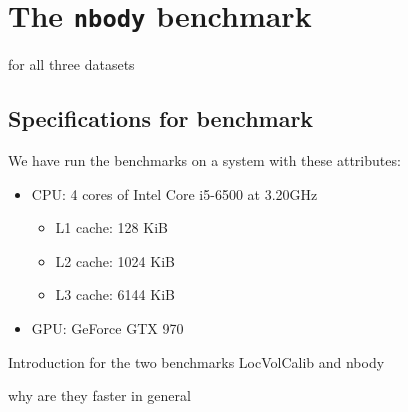 

\section*{The \texttt{nbody} benchmark}

for all three datasets


\subsection*{Specifications for benchmark}
We have run the benchmarks on a system with these attributes:
\begin{itemize}
\item CPU: 4 cores of Intel Core i5-6500 at 3.20GHz
  \begin{itemize}
  \item L1 cache: 128 KiB 
  \item L2 cache: 1024 KiB 
  \item L3 cache: 6144 KiB 
  \end{itemize}
\item GPU: GeForce GTX 970
\end{itemize}


Introduction for the two benchmarks LocVolCalib and nbody



why are they faster in general




